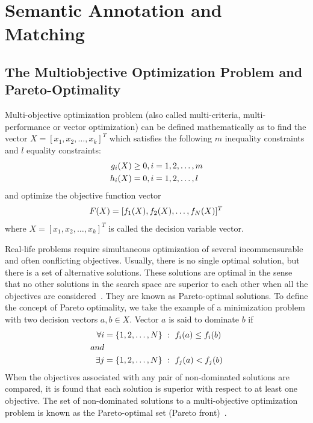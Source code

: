 \section{Semantic Annotation and Matching}
\label{sec:annotAndMatching}
\subsection{The Multiobjective Optimization Problem and Pareto-Optimality}
Multi-objective optimization problem (also called multi-criteria, multi-performance or vector optimization) can be defined mathematically as to find the vector $X=[x_1, x_2, \ldots, x_k]^T$ which satisfies the following $m$ inequality constraints and $l$ equality constraints:
\begin{align}
\notag g_i(X)&\geq0, i=1,2,\ldots,m\\
\notag h_i(X)&=0, i=1,2,\ldots,l
\end{align}
and optimize the objective function vector
\begin{align}
\notag F(X)=[f_1(X), f_2(X), \ldots, f_N(X)]^T
\end{align}
where $X=[x_1, x_2, \ldots, x_k]^T$ is called the decision variable vector.

Real-life problems require simultaneous optimization of several incommensurable and often conflicting objectives. Usually, there is no single optimal solution, but there is a set of alternative solutions. These solutions are optimal in the sense that no other solutions in the search space are superior to each other when all the objectives are considered~\cite{SumanSurvey}. They are known as Pareto-optimal solutions. To define the concept of Pareto optimality, we take the example of a minimization problem with two decision vectors $a, b\in X$. Vector $a$ is said to dominate $b$ if
\begin{align}
\notag \forall i &= \{1,2,\ldots,N\}~:~f_i(a)\leq f_i(b)\\
\notag and\\
\notag \exists j &= \{1,2,\ldots,N\}~:~f_j(a)<f_j(b)
\end{align}
When the objectives associated with any pair of non-dominated solutions are compared, it is found that each solution is superior with respect to at least one objective. The set of non-dominated solutions to a multi-objective optimization problem is known as the Pareto-optimal set (Pareto front)~\cite{Zitzler98multiobjectiveoptimization}.

